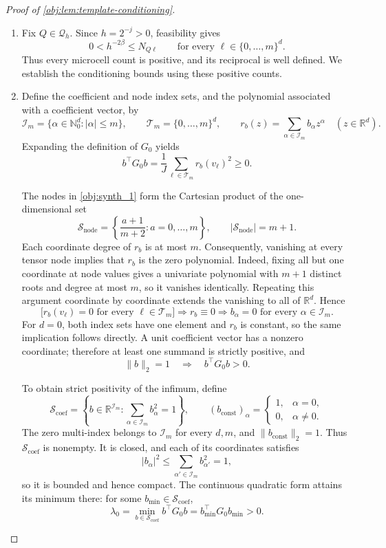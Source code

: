 \begin{proof}[Proof of \cref{obj:lem:template-conditioning}]
\begin{enumerate}
\item Fix \(Q\in\mathcal Q_h\). Since \(h=2^{-j}>0\), feasibility gives
\[
0<h^{-2\beta}\le N_{Q\ell}
\qquad\text{for every }\ell\in\{0,\ldots,m\}^d.
\]
Thus every microcell count is positive, and its reciprocal is well defined. We establish the conditioning bounds using these positive counts.

\item Define the coefficient and node index sets, and the polynomial associated with a coefficient vector, by
\[
\mathcal I_m=\{\alpha\in\mathbb N_0^d:|\alpha|\le m\},
\qquad
\mathcal T_m=\{0,\ldots,m\}^d,
\qquad
r_b(z)=\sum_{\alpha\in\mathcal I_m}b_\alpha z^\alpha
\quad(z\in\mathbb R^d).
\]
Expanding the definition of \(G_0\) yields
\[
b^\top G_0b=\frac1J\sum_{\ell\in\mathcal T_m}r_b(v_\ell)^2\ge0.
\]

The nodes in \cref{obj:synth_1} form the Cartesian product of the one-dimensional set
\[
\mathcal S_{\mathrm{node}}
=\left\{\frac{a+1}{m+2}:a=0,\ldots,m\right\},
\qquad
|\mathcal S_{\mathrm{node}}|=m+1.
\]
Each coordinate degree of \(r_b\) is at most \(m\). Consequently, vanishing at every tensor node implies that \(r_b\) is the zero polynomial. Indeed, fixing all but one coordinate at node values gives a univariate polynomial with \(m+1\) distinct roots and degree at most \(m\), so it vanishes identically. Repeating this argument coordinate by coordinate extends the vanishing to all of \(\mathbb R^d\). Hence
\[
\bigl[r_b(v_\ell)=0\text{ for every }\ell\in\mathcal T_m\bigr]
\Longrightarrow r_b\equiv0
\Longrightarrow b_\alpha=0\text{ for every }\alpha\in\mathcal I_m.
\]
For \(d=0\), both index sets have one element and \(r_b\) is constant, so the same implication follows directly. A unit coefficient vector has a nonzero coordinate; therefore at least one summand is strictly positive, and
\[
\|b\|_2=1\quad\Longrightarrow\quad b^\top G_0b>0.
\]

To obtain strict positivity of the infimum, define
\[
\mathcal S_{\mathrm{coef}}
=\left\{b\in\mathbb R^{\mathcal I_m}:
\sum_{\alpha\in\mathcal I_m}b_\alpha^2=1\right\},
\qquad
(b_{\mathrm{const}})_\alpha=
\begin{cases}
1,&\alpha=0,\\
0,&\alpha\ne0.
\end{cases}
\]
The zero multi-index belongs to \(\mathcal I_m\) for every \(d,m\), and
\(\|b_{\mathrm{const}}\|_2=1\). Thus \(\mathcal S_{\mathrm{coef}}\) is nonempty.
It is closed, and each of its coordinates satisfies
\[
|b_\alpha|^2\le\sum_{\alpha'\in\mathcal I_m}b_{\alpha'}^2=1,
\]
so it is bounded and hence compact. The continuous quadratic form attains its minimum there: for some \(b_{\min}\in\mathcal S_{\mathrm{coef}}\),
\[
\lambda_0
=\min_{b\in\mathcal S_{\mathrm{coef}}}b^\top G_0b
=b_{\min}^\top G_0b_{\min}>0.
\]


\end{enumerate}
\end{proof}
